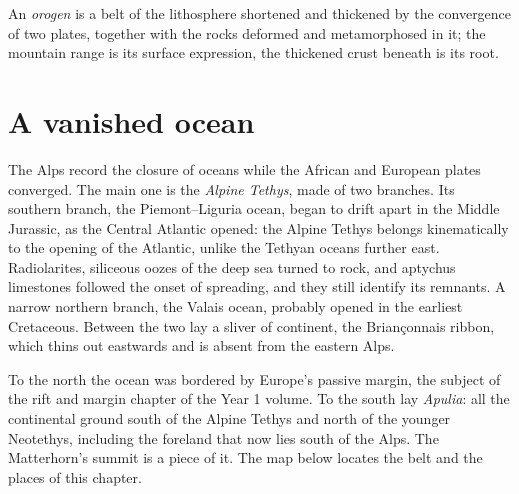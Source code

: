 \begin{definition}[Orogen]\label{def:b2:alpine-orogen:orogen}
An \emph{orogen} is a belt of the lithosphere shortened and thickened by the
convergence of two plates, together with the rocks deformed and metamorphosed in it; the
mountain range is its surface expression, the thickened crust beneath is its root.
\end{definition}

\section{A vanished ocean}\label{sec:b2:alpine-orogen:tethys}

The Alps record the closure of oceans while the African and European plates converged.
The main one is the \emph{Alpine Tethys}, made of two branches. Its southern branch, the
Piemont--Liguria ocean, began to drift apart in the Middle Jurassic, as the Central Atlantic
opened: the Alpine Tethys belongs kinematically to the opening of the Atlantic, unlike the
Tethyan oceans further east. Radiolarites, siliceous oozes of the deep sea turned to rock,
and aptychus limestones followed the onset of spreading, and they still identify its
remnants. A narrow northern branch, the Valais ocean, probably opened in the earliest
Cretaceous. Between the two lay a sliver of continent, the Briançonnais ribbon, which thins
out eastwards and is absent from the eastern Alps.

To the north the ocean was bordered by Europe's passive margin, the subject of the rift and
margin chapter of the Year 1 volume. To the south lay \emph{Apulia}: all the continental
ground south of the Alpine Tethys and north of the younger Neotethys, including the foreland
that now lies south of the Alps. The Matterhorn's summit is a piece of it.
The map below locates the belt and the places of this chapter.

